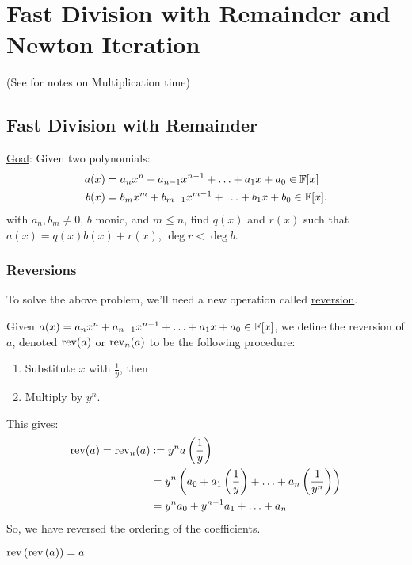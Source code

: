
\section{Fast Division with Remainder and Newton Iteration}

(See  for notes on Multiplication time)

\subsection{Fast Division with Remainder}
\ul{Goal}: Given two polynomials: 
\begin{align*}
    a(x) &= a_nx^n + a_{n-1}x^{n-1} + \ldots + a_1x + a_0 \in \operatorname{\mathbb{F}}[x] \\
    b(x) &= b_mx^m + b_{m-1}x^{m-1} + \ldots + b_1x + b_0 \in \operatorname{\mathbb{F}}[x].
\end{align*} 
with $a_n, b_m \neq 0$, $b$ monic, and $m \leq n$, find $q(x)$ and $r(x)$ such that $a(x) = q(x)b(x) + r(x)$, $\deg r < \deg b$.

\subsubsection{Reversions}
To solve the above problem, we'll need a new operation called \ul{reversion}. 

Given $a(x) = a_nx^n + a_{n-1}x^{n-1} + \ldots + a_1x + a_0 \in \operatorname{\mathbb{F}}[x]$, we define the reversion of $a$, denoted $\operatorname{rev}(a)$ or $\operatorname{rev}_n(a)$ to be the following procedure:
\begin{enumerate}
    \item Substitute $x$ with $\frac{1}{y}$, then
    \item Multiply by $y^n$.
\end{enumerate} 
This gives:
\begin{equation}
    \begin{aligned}
        \operatorname{rev}(a) = \operatorname{rev}_n(a) &:= y^na\left(\frac{1}{y}\right) \\
        &= y^n\left(a_0 + a_1\left(\frac{1}{y}\right) + \ldots + a_n\left(\frac{1}{y^n}\right)\right) \\
        &= y^na_0 + y^{n-1}a_1 + \ldots + a_n
    \end{aligned}
\end{equation}
So, we have reversed the ordering of the coefficients.

\begin{remark}
    $\operatorname{rev}\left(\operatorname{rev}\left(a\right)\right) = a$
\end{remark}

